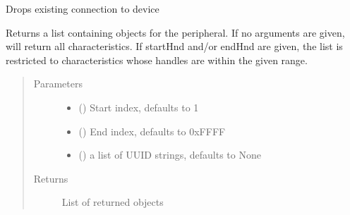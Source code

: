 \documentclass[letterpaper,10pt,english]{sphinxmanual}
\begin{document}
\begin{fulllineitems}

\begin{fulllineitems}
\label{\detokenize{PandaBot:PandaBot.PandaBotDevice.disconnect}}
Drops existing connection to device

\end{fulllineitems}


\begin{fulllineitems}
\label{\detokenize{PandaBot:PandaBot.PandaBotDevice.getCharacteristics}}
Returns a list containing  objects for the peripheral. If no arguments are given, will return all characteristics. If startHnd and/or endHnd are given, the list is restricted to characteristics whose handles are within the given range.
\begin{quote}\begin{description}
\item[{Parameters}] \leavevmode\begin{itemize}
\item {} 
 (\sphinxstyleliteralemphasis{\sphinxupquote{, }}) \textendash{} Start index, defaults to 1

\item {} 
 (\sphinxstyleliteralemphasis{\sphinxupquote{, }}) \textendash{} End index, defaults to 0xFFFF

\item {} 
 (\sphinxstyleliteralemphasis{\sphinxupquote{, }}) \textendash{} a list of UUID strings, defaults to None

\end{itemize}

\item[{Returns}] \leavevmode
List of returned  objects


\end{description}
\end{quote}
\end{fulllineitems}
\end{fulllineitems}
\end{document}
